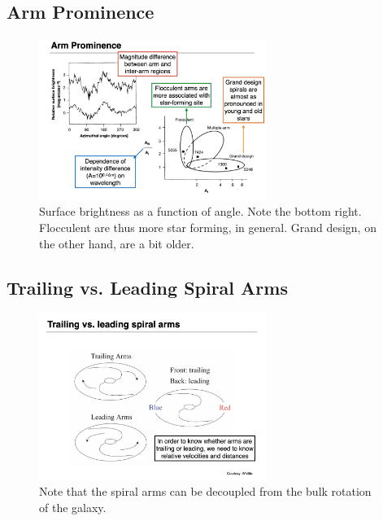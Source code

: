 \documentclass{article}
\begin{document}
\subsection{Arm Prominence}

\begin{figure}
    \centering
    \includegraphics[width=0.66\textwidth]{figs/Screen Shot 2021-10-27 at 10.04.48 AM.png}
    \caption{Surface brightness as a function of angle. Note the bottom right. Flocculent are thus more star forming, in general. Grand design, on the other hand, are a bit older. }
    \label{fig:asdasd}
\end{figure}

\subsection{Trailing vs. Leading Spiral Arms}

\begin{figure}
    \centering
    \includegraphics[width=0.66\textwidth]{figs/Screen Shot 2021-10-27 at 10.07.42 AM.png}
    \caption{Note that the spiral arms can be decoupled from the bulk rotation of the galaxy. }
    \label{fig:trailing_leading}
\end{figure}
\end{document}
